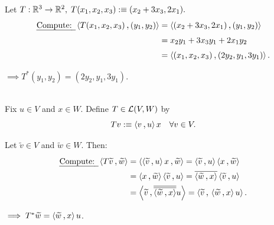 \begin{example}
  \phantom{.} \\
  Let $T: \mathbb{R}^3 \to \mathbb{R}^2, \; T(x_1,x_2,x_3):\equiv (x_2+3x_3,2x_1).$
  \begin{equation}
    \begin{aligned}
      \text{\emph{Compute: }} \ip{T(x_1,x_2,x_3)}{(y_1, y_2)}
      & = \ip{(x_2+3x_3,2x_1)}{(y_1,y_2)} \\
      & = x_2 y_1 + 3 x_3 y_1 + 2 x_1 y_2 \\
      & = \ip{(x_1, x_2, x_3)}{(2 y_2,y_1,3y_1)}. \\
    \end{aligned}
  \end{equation}

  $\implies T^{*}(y_1, y_2) = (2y_2, y_1, 3y_1).$
\end{example}

\begin{example}
  \phantom{.} \\
  Fix $u \in V$ and $x \in W$. Define $T \in \mathcal{L}(V,W)$ by
  \[
    Tv :\equiv \ip{v}{u} x \quad \forall v \in V.
  \]

 Let $\widetilde v \in V$ and $\widetilde w \in W$. Then:
 \begin{equation}
   \begin{aligned}
     \text{\emph{Compute: }}
     \ip{T \widetilde v}{\widetilde w}
     & = \ip{\ip{\widetilde v}{u}x}{\widetilde w} = \ip{\widetilde v}{u}\ip{x}{\widetilde w} \\
     & = \ip{x}{\widetilde w}\ip{\widetilde v}{u} = \overline{\ip{\widetilde w}{x}}\ip{\widetilde v}{u} \\
     & = \ip{\widetilde v}{\overline{\overline{\ip{\widetilde w}{x}}} u} = \ip{\widetilde v}{\ip{\widetilde w}{x}u}.
   \end{aligned}
 \end{equation}

 $\implies T^{*} \widetilde w = \ip{\widetilde w}{x}u$.
\end{example}

